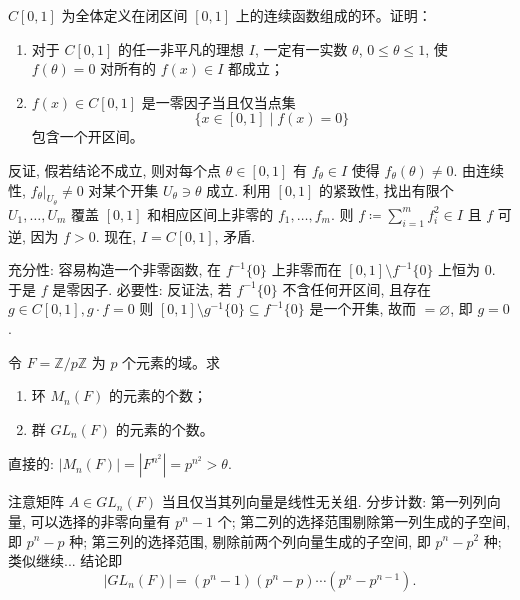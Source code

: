 \begin{problem}
    $C[0,1]$ 为全体定义在闭区间 $[0,1]$ 上的连续函数组成的环。证明：

\begin{enumerate}[label=(\roman*)]
    \item 对于 $ C[0,1] $ 的任一非平凡的理想 $ I $, 一定有一实数 $ \theta $, $ 0 \leq \theta \leq 1 $, 使 $ f(\theta) = 0 $ 对所有的 $ f(x) \in I $ 都成立；
    \item $ f(x) \in C[0,1] $ 是一零因子当且仅当点集
    \[
    \{ x \in [0,1] \mid f(x) = 0 \}
    \]
    包含一个开区间。
\end{enumerate}

\end{problem}

\begin{solution}
    反证, 假若结论不成立, 则对每个点 $\theta\in[0,1]$ 有 $f_{\theta}\in I$ 使得 $f_{\theta}(\theta)\ne0$. 
    由连续性, $\left.{f_{\theta}}\right|_{U_{\theta}}^{}\ne0$ 对某个开集 $U_{\theta}\ni\theta$ 成立. 
    利用 $[0,1]$ 的紧致性, 找出有限个 $U_{1},\dots,U_{m}$ 覆盖 $[0,1]$ 和相应区间上非零的 $f_{1},\dots,f_{m}$. 
    则 $f \coloneqq \sum_{i=1}^{m}f_{i}^{2}\in I$ 且 $f$ 可逆, 因为 $f>0$. 
    现在, $I=C[0,1]$, 矛盾. 
    \par 充分性: 容易构造一个非零函数, 在 $f^{-1}\{0\}$ 上非零而在 $[0,1]\setminus f^{-1}\{0\}$ 上恒为 $0$. 
    于是 $f$ 是零因子.
    必要性: 反证法, 若 $f^{-1}\{0\}$ 不含任何开区间, 且存在 $g\in C[0,1], g\cdot f=0$ 则 $[0,1]\setminus g^{-1}\{0\}\subseteq f^{-1}\{0\}$ 
    是一个开集, 故而 $=\varnothing$, 即 $g=0$.
\end{solution}

\begin{problem}
    令 $ F = \mathbb{Z}/p\mathbb{Z} $ 为 $ p $ 个元素的域。求
    \begin{enumerate}[label=(\roman*)]
        \item 环 $ M_n(F) $ 的元素的个数；
        \item 群 $ GL_n(F) $ 的元素的个数。
    \end{enumerate}
\end{problem}

\begin{solution}
    直接的: $|M_{n}(F)|=|F^{n^{2}}|=p^{n^{2}}>\theta$. 
    \par 注意矩阵 $A\in GL_{n}(F)$ 当且仅当其列向量是线性无关组. 分步计数: 第一列列向量, 可以选择的非零向量有 $p^{n}-1$ 个; 
    第二列的选择范围剔除第一列生成的子空间, 即 $p^{n}-p$ 种; 第三列的选择范围, 剔除前两个列向量生成的子空间, 即 $p^{n}-p^{2}$ 种; 
    类似继续... 结论即
        \[
            |GL_{n}(F)|=(p^{n}-1)(p^{n}-p)\cdots(p^{n}-p^{n-1}).
        \]
\end{solution}

